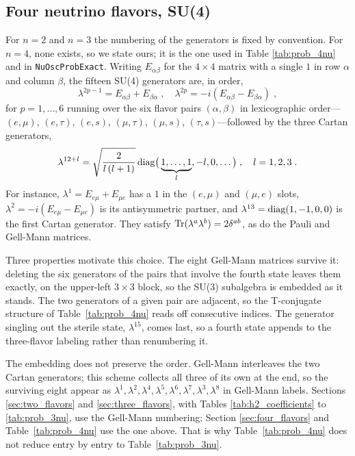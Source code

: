 \documentclass[final,5p,times,twocolumn,sort,compress]{elsarticle}
\begin{document}

\subsection{Four neutrino flavors, SU(4)}
\label{app:matrices_4nu}

For $n=2$ and $n=3$ the numbering of the generators is fixed by convention.  For $n=4$, none exists, so we state ours; it is the one used in Table \ref{tab:prob_4nu} and in {\tt NuOscProbExact}.  Writing $E_{\alpha\beta}$ for the $4 \times 4$ matrix with a single $1$ in row $\alpha$ and column $\beta$, the fifteen SU(4) generators are, in order,
\begin{equation}
 \lambda^{2p-1} = E_{\alpha\beta} + E_{\beta\alpha} \;, \quad
 \lambda^{2p} = -i\left(E_{\alpha\beta} - E_{\beta\alpha}\right) \;,
\end{equation}
for $p = 1, \ldots, 6$ running over the six flavor pairs $(\alpha,\beta)$ in lexicographic order---$(e,\mu)$, $(e,\tau)$, $(e,s)$, $(\mu,\tau)$, $(\mu,s)$, $(\tau,s)$---followed by the three Cartan generators,
\begin{equation}
 \lambda^{12+l}
 =
 \sqrt{\frac{2}{l\left(l+1\right)}}\,
 {\rm diag}\big(\underbrace{1, \ldots, 1}_{l}, -l, 0, \ldots\big) \;,
 \quad
 l = 1, 2, 3 \;.
\end{equation}
For instance, $\lambda^1 = E_{e\mu} + E_{\mu e}$ has a $1$ in the $(e,\mu)$ and $(\mu,e)$ slots, $\lambda^2 = -i(E_{e\mu} - E_{\mu e})$ is its antisymmetric partner, and $\lambda^{13} = {\rm diag}(1,-1,0,0)$ is the first Cartan generator.  They satisfy ${\rm Tr}(\lambda^a\lambda^b) = 2\delta^{ab}$, as do the Pauli and Gell-Mann matrices.

Three properties motivate this choice.  The eight Gell-Mann matrices survive it: deleting the six generators of the pairs that involve the fourth state leaves them exactly, on the upper-left $3 \times 3$ block, so the SU(3) subalgebra is embedded as it stands.  The two generators of a given pair are adjacent, so the T-conjugate structure of Table~\ref{tab:prob_4nu} reads off consecutive indices.  The generator singling out the sterile state, $\lambda^{15}$, comes last, so a fourth state appends to the three-flavor labeling rather than renumbering it.

The embedding does not preserve the order.  Gell-Mann interleaves the two Cartan generators; this scheme collects all three of its own at the end, so the surviving eight appear as $\lambda^1, \lambda^2, \lambda^4, \lambda^5, \lambda^6, \lambda^7, \lambda^3, \lambda^8$ in Gell-Mann labels.  Sections \ref{sec:two_flavors} and \ref{sec:three_flavors}, with Tables \ref{tab:h2_coefficients} to \ref{tab:prob_3nu}, use the Gell-Mann numbering; Section \ref{sec:four_flavors} and Table~\ref{tab:prob_4nu} use the one above.  That is why Table~\ref{tab:prob_4nu} does not reduce entry by entry to Table~\ref{tab:prob_3nu}.
\end{document}
